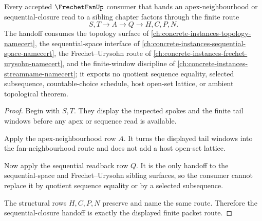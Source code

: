 \begin{theorem}
\label{thm:frechet-fan-sequential-closure-handoff}
Every accepted $\FrechetFanUp$ consumer that hands an apex-neighbourhood or sequential-closure read to a sibling chapter factors through the finite route
$$
S,T \longrightarrow A \longrightarrow Q \longrightarrow H,C,P,N .
$$
The handoff consumes the topology surface of \autoref{ch:concrete-instances-topology-namecert}, the sequential-space interface of \autoref{ch:concrete-instances-sequential-space-namecert}, the Frechet--Urysohn route of \autoref{ch:concrete-instances-frechet-urysohn-namecert}, and the finite-window discipline of \autoref{ch:concrete-instances-streamname-namecert}; it exports no quotient sequence equality, selected subsequence, countable-choice schedule, host open-set lattice, or ambient topological theorem.
\end{theorem}
\begin{proof}
Begin with $S,T$. They display the inspected spokes and the finite tail windows before any apex or sequence read is available.

Apply the apex-neighbourhood row $A$. It turns the displayed tail windows into the fan-neighbourhood route and does not add a host open-set lattice.

Now apply the sequential readback row $Q$. It is the only handoff to the sequential-space and Frechet--Urysohn sibling surfaces, so the consumer cannot replace it by quotient sequence equality or by a selected subsequence.

The structural rows $H,C,P,N$ preserve and name the same route. Therefore the sequential-closure handoff is exactly the displayed finite packet route.
\end{proof}




